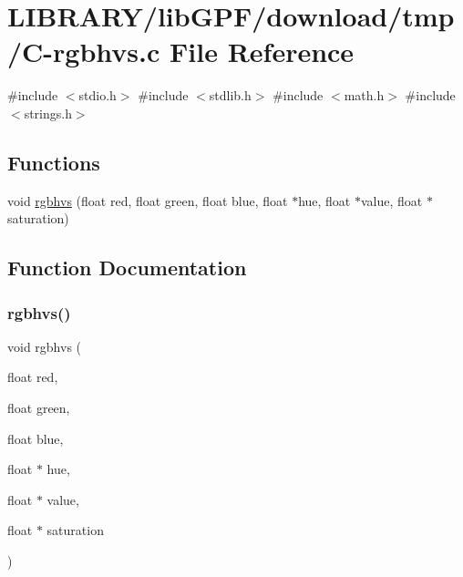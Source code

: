 \hypertarget{C-rgbhvs_8c}{}\section{L\+I\+B\+R\+A\+R\+Y/lib\+G\+P\+F/download/tmp/\+C-\/rgbhvs.c File Reference}
\label{C-rgbhvs_8c}
{\ttfamily \#include $<$stdio.\+h$>$}\newline
{\ttfamily \#include $<$stdlib.\+h$>$}\newline
{\ttfamily \#include $<$math.\+h$>$}\newline
{\ttfamily \#include $<$strings.\+h$>$}\newline
\subsection*{Functions}
\begin{DoxyCompactItemize}
\item 
void \hyperlink{C-rgbhvs_8c_a4110202639bfb2a997338ea37775dca8}{rgbhvs} (float red, float green, float blue, float $\ast$hue, float $\ast$value, float $\ast$saturation)
\end{DoxyCompactItemize}


\subsection{Function Documentation}
\mbox{\label{C-rgbhvs_8c_a4110202639bfb2a997338ea37775dca8}} 
\subsubsection{\texorpdfstring{rgbhvs()}{rgbhvs()}}
{\footnotesize\ttfamily void rgbhvs (\begin{DoxyParamCaption}\item[{float}]{red,  }\item[{float}]{green,  }\item[{float}]{blue,  }\item[{float $\ast$}]{hue,  }\item[{float $\ast$}]{value,  }\item[{float $\ast$}]{saturation }\end{DoxyParamCaption})}

